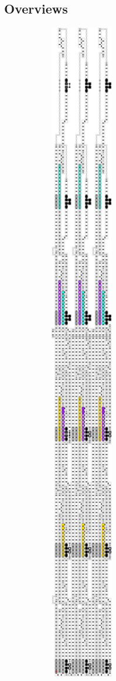     \subsection{Overviews}

    \begin{figure}[H]
        \centering
        \begin{subfigure}[t]{0.3\textwidth}
            \centering
            \includegraphics[width=0.3\textwidth]{full_overview_case3_colored}

\end{subfigure}
\end{figure}
